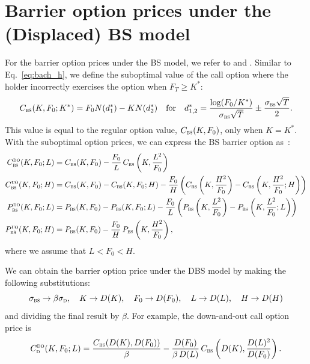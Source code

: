 \documentclass[a4paper,review]{elsarticle}
\newcommand{\qtext}[2][\quad]{#1\text{#2}#1}
\newcommand{\sigmad}{\sigma_\textsc{d}}
\newcommand{\sigmabs}{\sigma_\textsc{bs}}
\newcommand{\bs}{\textsc{bs}}
\newcommand{\Call}[2]{C_\textsc{#1}^\textsc{#2}}
\newcommand{\Put}[2]{P_\textsc{#1}^\textsc{#2}}
\begin{document}
\appendix
\section{Barrier option prices under the (Displaced) BS model} \label{apdx:bs_barrier}
For the barrier option prices under the BS model, we refer to \citet{zhang2001exotic} and \citet{haug2007complete}. Similar to Eq.~\eqref{eq:bach_h}, we define the suboptimal value of the call option where the holder incorrectly exercises the option when $F_T\ge K^*$: 
\begin{equation} \label{eq:bsm_h}
C_\bs(K, F_0;K^*) = F_0 N(d^*_1) - K N(d^*_2) \qtext{for}
d^*_{1,2}=\frac{\text{log}(F_0/K^*)}{\sigmabs \sqrt{T}} \pm \frac{\sigmabs \sqrt{T}}{2}.
\end{equation}
This value is equal to the regular option value, $C_\bs(K, F_0)$, only when $K=K^*$. With the suboptimal option prices, we can express the BS barrier option as~\citep{haug2007complete}:
\begin{align}
\Call{bs}{do}(K, F_0; L) &= C_\bs (K, F_0) - \frac{F_0}{L}\, C_\bs\left(K, \frac{L^2}{F_0}\right) \\ 
\Call{bs}{uo}(K, F_0; H) &= C_\bs (K, F_0) - C_\bs (K, F_0; H) - \frac{F_0}{H} \left(C_\bs\left(K, \frac{H^2}{F_0}\right) - C_\bs\left(K, \frac{H^2}{F_0};H\right)\right) \\
\Put{bs}{do}(K, F_0; L) &= P_\bs (K, F_0)-P_\bs (K, F_0; L) - \frac{F_0}{L} \left(P_\bs\left(K, \frac{L^2}{F_0}\right)-P_\bs\left(K, \frac{L^2}{F_0}; L\right) \right) \\
\Put{bs}{uo}(K, F_0; H) &= P_\bs (K, F_0) - \frac{F_0}{H}\, P_\bs\left(K, \frac{H^2}{F_0}\right),
\end{align}
where we assume that $L < F_0 < H $.

We can obtain the barrier option price under the DBS model by making the following substitutions:
$$ \sigmabs \rightarrow \beta \sigmad, \quad K \rightarrow D(K), \quad F_0 \rightarrow D(F_0),\quad L \rightarrow D(L),\quad H \rightarrow D(H)
$$
and dividing the final result by $\beta$. For example, the down-and-out call option price is
$$ \Call{d}{do}(K, F_0; L) = \frac{C_\bs (D(K), D(F_0))}{\beta} - \frac{D(F_0)}{\beta\,D(L)}\, C_\bs\left(D(K), \frac{D(L)^2}{D(F_0)}\right).
$$

\singlespacing

\end{document}
